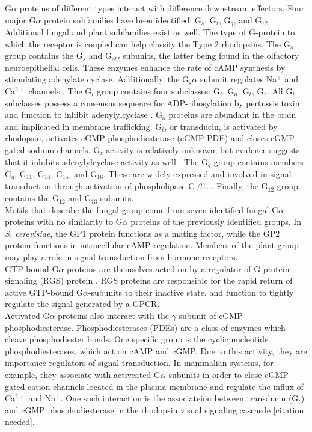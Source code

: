 \indent G$\alpha$ proteins of different types interact with difference downstream effectors. Four major G$\alpha$ protein subfamilies have been identified: G$_{s}$, G$_{i}$, G$_{q}$, and G$_{12}$ \cite{Hepler1992}. Additional fungal \cite{Bolker1998} and plant \cite{Ma1994} subfamilies exist as well. The type of G-protein to which the receptor is coupled can help classify the Type 2 rhodopsins. The G$_{s}$ group contains the G$_{s}$ and G$_{olf}$  subunits, the latter being found in the olfactory neuroepithelial cells. These enzymes enhance the rate of cAMP synthesis by stimulating adenylate cyclase. Additionally, the G$_{s}\alpha$ subunit regulates Na$^{+}$ and Ca$^{2+}$ channels \cite{Hepler1992}. The G$_{i}$ group contains four subclasses: G$_{i}$, G$_{o}$, G$_{t}$, G$_{z}$. All G$_{i}$ subclasses possess a consensus sequence for ADP-ribosylation by pertussis toxin and function to inhibit adenylylcyclase \cite{KABMycotaIII}. G$_{o}$ proteins are abundant in the brain and implicated in membrane trafficking. G$_{t}$, or transducin, is activated by rhodopsin, activates cGMP-phosphodiesterase (cGMP-PDE) and closes cGMP-gated sodium channels. G$_{z}$ activity is relatively unknown, but evidence suggests that it inhibits adenylylcyclase activity as well \cite{KABMycotaIII}. The G$_{q}$ group contains members G$_{q}$, G$_{11}$, G$_{14}$, G$_{15}$, and G$_{16}$. These are widely expressed and involved in signal transduction through activation of phospholipase C-$\beta$1. \cite{KABMycotaIII}. Finally, the G$_{12}$ group contains the G$_{12}$ and G$_{13}$ subunits.\\
\indent Motifs that describe the fungal group come from seven identified fungal G$\alpha$ proteins with no similarity to G$\alpha$ proteins of the previously identified groups. In \textit{S. cerevisiae}, the GP1 protein functions as a mating factor, while the GP2 protein functions in intracellular cAMP regulation. Members of the plant group may play a role in signal transduction from hormone receptors.\\
\indent GTP-bound G$\alpha$ proteins are themselves acted on by a regulator of G protein signaling (RGS) protein \cite{DeVries2000}. RGS proteins are responsible for the rapid return of active GTP-bound G$\alpha$-subunits to their inactive state, and function to tightly regulate the signal generated by a GPCR. \\
\indent Activated G$\alpha$ proteins also interact with the $\gamma$-subunit of cGMP phosphodiesterase. Phosphodiesterases (PDEs) are a class of enzymes which cleave phosphodiester bonds. One specific group is the cyclic nucleotide phosphodiesterases, which act on cAMP and cGMP. Due to this activity, they are importance regulators of signal transduction. In mammalian systems, for example, they associate with activeated G$\alpha$ subunits in order to close cGMP-gated cation channels located in the plasma membrane and regulate the influx of Ca$^{2+}$ and Na$^{+}$. One such interaction is the associateion between transducin (G$_{t}$) and cGMP phosphodiesterase in the rhodopsin visual signaling cascasde [citation needed].\\
